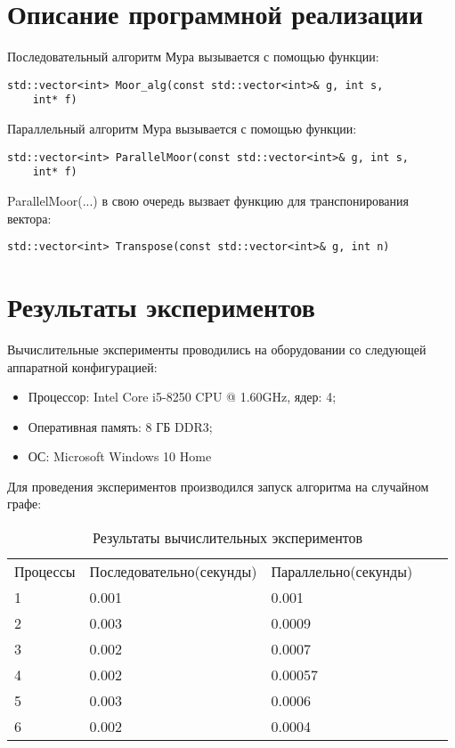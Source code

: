 \documentclass{report}
\begin{document}
\section*{Описание программной реализации}
Последовательный алгоритм Мура вызывается с помощью функции:
\begin{lstlisting}
std::vector<int> Moor_alg(const std::vector<int>& g, int s,
    int* f) 
\end{lstlisting}
\par Параллельный алгоритм Мура вызывается с помощью функции:
\begin{lstlisting}
std::vector<int> ParallelMoor(const std::vector<int>& g, int s,
    int* f)
\end{lstlisting}
\par ParallelMoor(...) в свою очередь вызвает функцию для транспонирования вектора:
\begin{lstlisting}
std::vector<int> Transpose(const std::vector<int>& g, int n)
\end{lstlisting}
\newpage

\section*{Результаты экспериментов}
Вычислительные эксперименты проводились на оборудовании со следующей аппаратной конфигурацией:

\begin{itemize}
\item Процессор: Intel Core i5-8250 CPU @ 1.60GHz, ядер: 4;
\item Оперативная память: 8 ГБ DDR3;
\item ОС: Microsoft Windows 10 Home
\end{itemize}

\par Для проведения экспериментов производился запуск алгоритма на случайном графе:
\\



\begin{table}[!h]
\begin{center}
\begin{tabular}{lllll}
Процессы & Последовательно(секунды) & Параллельно(секунды)  \\
1        & 0.001         & 0.001           \\
2        & 0.003        & 0.0009          \\
3        & 0.002         & 0.0007         \\
4        & 0.002       & 0.00057         \\
5        & 0.003        & 0.0006       \\
6        & 0.002         & 0.0004          
\end{tabular}
\end{center}
\caption{Результаты вычислительных экспериментов}
\centering
\end{table}
\end{document}
